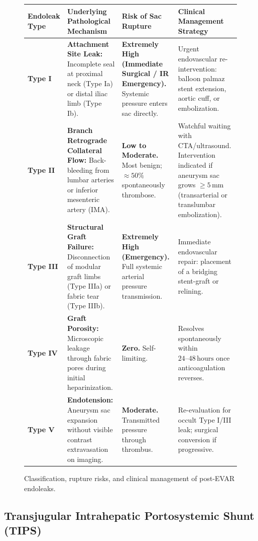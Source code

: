 \documentclass[11pt,a4paper]{article}
\begin{document}
\begin{figure}[htbp]
\centering
\setlength{\tabcolsep}{4pt}
\begin{tabular}{p{2.4cm}p{4.2cm}p{4.0cm}p{4.0cm}}
\toprule
\textbf{Endoleak Type} & \textbf{Underlying Pathological Mechanism} & \textbf{Risk of Sac Rupture} & \textbf{Clinical Management Strategy} \\
\midrule
\textbf{Type I} & \textbf{Attachment Site Leak:} Incomplete seal at proximal neck (Type Ia) or distal iliac limb (Type Ib). & \textbf{Extremely High (Immediate Surgical / IR Emergency).} Systemic pressure enters sac directly. & Urgent endovascular re-intervention: balloon palmaz stent extension, aortic cuff, or embolization. \\
\addlinespace
\textbf{Type II} & \textbf{Branch Retrograde Collateral Flow:} Back-bleeding from lumbar arteries or inferior mesenteric artery (IMA). & \textbf{Low to Moderate.} Most benign; $\approx 50\%$ spontaneously thrombose. & Watchful waiting with CTA/ultrasound. Intervention indicated if aneurysm sac grows $\ge 5\,\text{mm}$ (transarterial or translumbar embolization). \\
\addlinespace
\textbf{Type III} & \textbf{Structural Graft Failure:} Disconnection of modular graft limbs (Type IIIa) or fabric tear (Type IIIb). & \textbf{Extremely High (Emergency).} Full systemic arterial pressure transmission. & Immediate endovascular repair: placement of a bridging stent-graft or relining. \\
\addlinespace
\textbf{Type IV} & \textbf{Graft Porosity:} Microscopic leakage through fabric pores during initial heparinization. & \textbf{Zero.} Self-limiting. & Resolves spontaneously within $24\text{--}48\,\text{hours}$ once anticoagulation reverses. \\
\addlinespace
\textbf{Type V} & \textbf{Endotension:} Aneurysm sac expansion without visible contrast extravasation on imaging. & \textbf{Moderate.} Transmitted pressure through thrombus. & Re-evaluation for occult Type I/III leak; surgical conversion if progressive. \\
\bottomrule
\end{tabular}
\caption{Classification, rupture risks, and clinical management of post-EVAR endoleaks.}
\label{tab:endoleaks}
\end{figure}

\subsection{Transjugular Intrahepatic Portosystemic Shunt (TIPS)}
\end{document}

